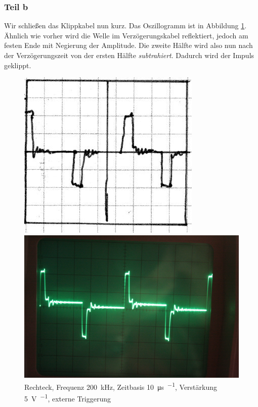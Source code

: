 \FloatBarrier
\subsubsection{Teil b}

Wir schließen das Klippkabel nun kurz. Das Oszillogramm ist in Abbildung
\ref{fig:0774}. Ähnlich wie vorher wird die Welle im Verzögerungskabel
reflektiert, jedoch am festen Ende mit Negierung der Amplitude. Die zweite
Hälfte wird also nun nach der Verzögerungszeit von der ersten Hälfte
\emph{subtrahiert}. Dadurch wird der Impuls geklippt.

\begin{figure}[htbp]
	\centering
	\begin{minipage}{.45\linewidth}
	\includegraphics[width=\linewidth]{Skizzen/IMG_0774-1500.jpg}
	\end{minipage}
	\hfill
	\begin{minipage}{.45\linewidth}
	\includegraphics[width=\linewidth]{Fotos/IMG_0774-1500.jpg}
	\end{minipage}
	\caption{%
		Rechteck, Frequenz \SI{200}{\kilo\hertz},
		Zeitbasis \SI{10}{\micro\second\per\division},
		Verstärkung \SI{5}{\volt\per\division},
		externe Triggerung
	}
	\label{fig:0774}
\end{figure}

